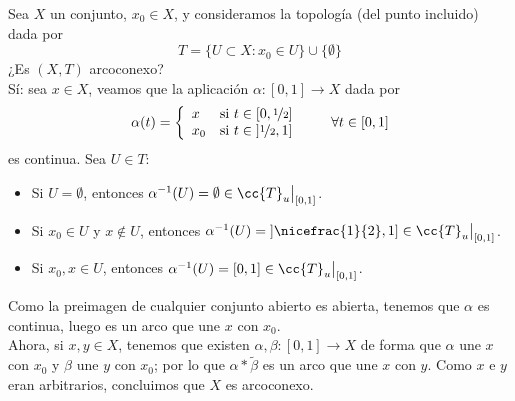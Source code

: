 \begin{ejercicio}
    Sea $X$ un conjunto, $x_0\in X$, y consideramos la topología (del punto incluido) dada por
    \begin{equation*}
        T = \{U\subset X : x_0 \in U\} \cup \{\emptyset \}
    \end{equation*}
    ¿Es $(X,T)$ arcoconexo?\\

    \noindent
    Sí: sea $x\in X$, veamos que la aplicación $\alpha:[0,1]\to X$ dada por
    \begin{equation*}
        \alpha(t) = \left\{\begin{array}{ll}
                x & \text{si } t\in [0,\nicefrac{1}{2}] \\
                x_0 & \text{si } t\in \left]\nicefrac{1}{2},1\right]
        \end{array}\right. \qquad \forall t\in [0,1]
    \end{equation*}
    es continua. Sea $U\in T$:
    \begin{itemize}
        \item Si $U = \emptyset $, entonces $\alpha^{-1}(U) = \emptyset \in \cc{T}_u\big|_{[0,1]}$.
        \item Si $x_0\in U$ y $x\notin U$, entonces $\alpha^{-1}(U) = \left]\nicefrac{1}{2},1\right]\in \cc{T}_u\big|_{[0,1]}$.
        \item Si $x_0,x\in U$, entonces $\alpha^{-1}(U) = [0,1] \in \cc{T}_u\big|_{[0,1]}$.
    \end{itemize}
    Como la preimagen de cualquier conjunto abierto es abierta, tenemos que $\alpha$ es continua, luego es un arco que une $x$ con $x_0$.\\

    \noindent
    Ahora, si $x,y\in X$, tenemos que existen $\alpha,\beta:[0,1]\to X$ de forma que $\alpha$ une $x$ con $x_0$ y $\beta$ une $y$ con $x_0$; por lo que $\alpha\ast\tilde{\beta}$ es un arco que une $x$ con $y$. Como $x$ e $y$ eran arbitrarios, concluimos que $X$ es arcoconexo.
\end{ejercicio}

